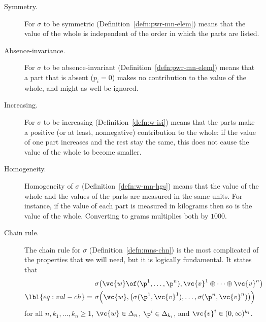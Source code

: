 \begin{description}
\item[Symmetry.]%
%
% 
For $\sigma$ to be symmetric
(Definition~\ref{defn:pwr-mn-elem}) means that the value
of the whole is independent of the order in which the parts are listed.

\item[Absence-invariance.]%
%
% 
For $\sigma$ to be absence-invariant
  (Definition~\ref{defn:pwr-mn-elem}) means that a part
  that is absent ($p_i = 0$) makes no contribution to the value of the
  whole, and might as well be ignored.

\item[Increasing.]%
%
% 
For $\sigma$ to be increasing (Definition~\ref{defn:w-isi}) means that the
parts make a positive (or at least, nonnegative) contribution to the
whole: if the value of one part increases and the rest stay the same, this
does not cause the value of the whole to become smaller.

\item[Homogeneity.]%
%
% 
Homogeneity of $\sigma$ (Definition~\ref{defn:w-mn-hgs}) means that the
value of the whole and the values of the parts are measured in the same
units.  For instance, if the value of each part is measured in kilograms
then so is the value of the whole.  Converting to grams multiplies both by
$1000$.

\item[Chain rule.]%
%
% 
The chain rule for $\sigma$ (Definition~\ref{defn:mns-chn}) is the most
complicated of the properties that we will need, but it is logically
fundamental.  It states that
% 
\begin{align}
\nonumber
&
\sigma\bigl( \vc{w} \of (\p^1, \ldots, \p^n),
\vc{v}^1 \oplus\cdots\oplus \vc{v}^n \bigr)
\\
\lbl{eq:val-ch}
=\ 
&
\sigma\Bigl(
\vc{w}, 
\bigl(
\sigma(\p^1, \vc{v}^1), \ldots, \sigma(\p^n, \vc{v}^n) 
\bigr)
\Bigr)  
\end{align}
% 
for all $n, k_1, \ldots, k_n \geq 1$, $\vc{w} \in \Delta_n$, $\p^i \in
\Delta_{k_i}$, and $\vc{v}^i \in (0, \infty)^{k_i}$.  


\end{description}
